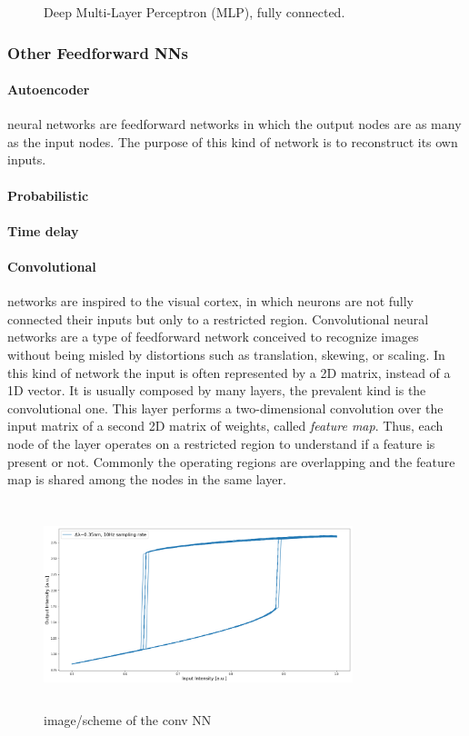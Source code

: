\begin{figure}[ht]
	\centering
	
	\caption{	Deep Multi-Layer Perceptron (MLP), fully connected.}
	\label{fig:deepMLP}
\end{figure}

\subsubsection{Other Feedforward NNs}
\label{sssec:Other_Feedforward_NNs}

\paragraph{Autoencoder} neural networks are feedforward networks in which the output nodes are as many as the input nodes.
The purpose of this kind of network is to reconstruct its own inputs.

\paragraph{Probabilistic}

\paragraph{Time delay}

\paragraph{Convolutional}\label{par:Convolutional} networks are inspired to the visual cortex, in which neurons are not fully connected their inputs but only to a restricted region.
Convolutional neural networks are a type of feedforward network conceived to recognize images without being misled by distortions such as translation, skewing, or scaling.
In this kind of network the input is often represented by a 2D matrix, instead of a 1D vector.
It is usually composed by many layers, the prevalent kind is the convolutional one.
This layer performs a two-dimensional convolution over the input matrix of a second 2D matrix of weights, called \textit{feature map}.
Thus, each node of the layer operates on a restricted region to understand if a feature is present or not.
Commonly the operating regions are overlapping and the feature map is shared among the nodes in the same layer.

\begin{figure}[ht]
	\centering
	\includegraphics[draft,width=9cm,height=6cm]{figures/foo.png}
	\caption{image/scheme of the conv NN}
	\label{fig:convolutionalNN}
\end{figure}


